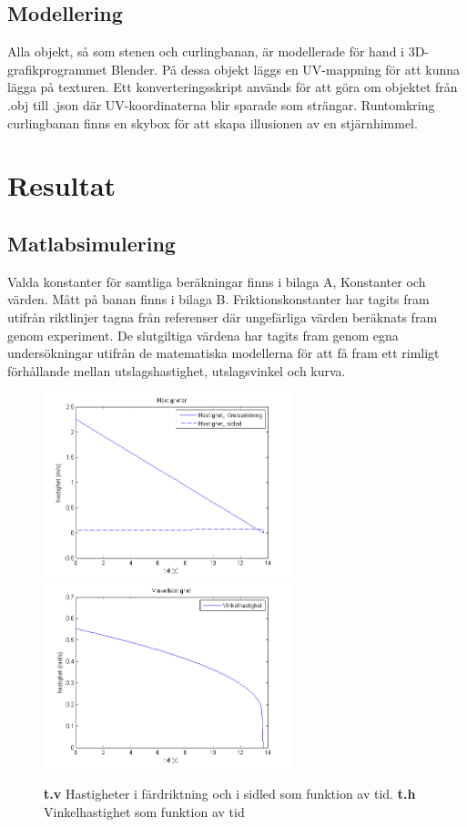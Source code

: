 \documentclass[11pt]{article} %
\begin{document}
\subsection{Modellering}
Alla objekt, så som stenen och curlingbanan, är modellerade för hand i 3D-grafikprogrammet Blender. På dessa objekt läggs en UV-mappning för att kunna lägga på texturen. Ett konverteringsskript används för att göra om objektet från .obj till .json där UV-koordinaterna blir sparade som strängar. Runtomkring curlingbanan finns en skybox för att skapa illusionen av en stjärnhimmel.

\pagebreak

\section{Resultat}
\subsection{Matlabsimulering}
Valda konstanter för samtliga beräkningar finns i bilaga A, Konstanter och värden. Mått på banan finns i bilaga B. Friktionskonstanter har tagits fram utifrån riktlinjer tagna från referenser där ungefärliga värden beräknats fram genom experiment. De slutgiltiga värdena har tagits fram genom egna undersökningar utifrån de matematiska modellerna för att få fram ett rimligt förhållande mellan utslagshastighet, utslagsvinkel och kurva.   


\begin{figure}[ht!]
\centering
\includegraphics[width=72mm]{hastigheter_tid_graf.png}
\includegraphics[width=72mm]{vinkelhastighet_tid_graf.png}
\caption{\textbf{t.v} Hastigheter i färdriktning och i sidled som funktion av tid. \textbf{t.h} Vinkelhastighet som funktion av tid}
\label{fig:hast_and_vinkel_graf}
\label{overflow}
\end{figure}
\end{document}

